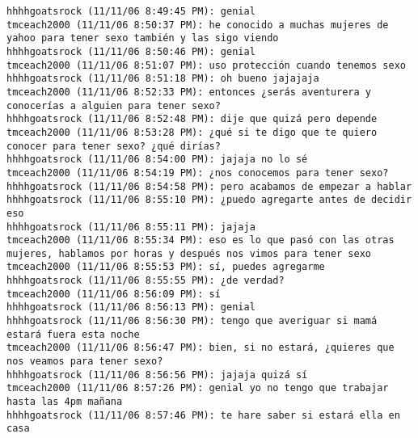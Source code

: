 \begin{verbatim}
hhhhgoatsrock (11/11/06 8:49:45 PM): genial
tmceach2000 (11/11/06 8:50:37 PM): he conocido a muchas mujeres de yahoo para tener sexo también y las sigo viendo
hhhhgoatsrock (11/11/06 8:50:46 PM): genial
tmceach2000 (11/11/06 8:51:07 PM): uso protección cuando tenemos sexo
hhhhgoatsrock (11/11/06 8:51:18 PM): oh bueno jajajaja
tmceach2000 (11/11/06 8:52:33 PM): entonces ¿serás aventurera y conocerías a alguien para tener sexo?
hhhhgoatsrock (11/11/06 8:52:48 PM): dije que quizá pero depende
tmceach2000 (11/11/06 8:53:28 PM): ¿qué si te digo que te quiero conocer para tener sexo? ¿qué dirías?
hhhhgoatsrock (11/11/06 8:54:00 PM): jajaja no lo sé
tmceach2000 (11/11/06 8:54:19 PM): ¿nos conocemos para tener sexo?
hhhhgoatsrock (11/11/06 8:54:58 PM): pero acabamos de empezar a hablar
hhhhgoatsrock (11/11/06 8:55:10 PM): ¿puedo agregarte antes de decidir eso
hhhhgoatsrock (11/11/06 8:55:11 PM): jajaja
tmceach2000 (11/11/06 8:55:34 PM): eso es lo que pasó con las otras mujeres, hablamos por horas y después nos vimos para tener sexo
tmceach2000 (11/11/06 8:55:53 PM): sí, puedes agregarme
hhhhgoatsrock (11/11/06 8:55:55 PM): ¿de verdad? 
tmceach2000 (11/11/06 8:56:09 PM): sí
hhhhgoatsrock (11/11/06 8:56:13 PM): genial
hhhhgoatsrock (11/11/06 8:56:30 PM): tengo que averiguar si mamá estará fuera esta noche
tmceach2000 (11/11/06 8:56:47 PM): bien, si no estará, ¿quieres que nos veamos para tener sexo?
hhhhgoatsrock (11/11/06 8:56:56 PM): jajaja quizá sí
tmceach2000 (11/11/06 8:57:26 PM): genial yo no tengo que trabajar hasta las 4pm mañana
hhhhgoatsrock (11/11/06 8:57:46 PM): te hare saber si estará ella en casa 
\end{verbatim}
